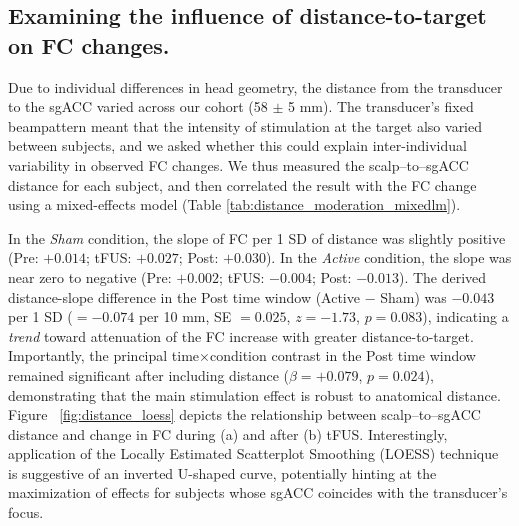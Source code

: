 \subsection*{Examining the influence of distance-to-target on FC changes.}
\noindent
Due to individual differences in head geometry, the distance from the transducer to the sgACC varied across our cohort (58 $\pm$ 5 mm). The transducer's fixed beampattern meant that the intensity of stimulation at the target also varied between subjects, and we asked whether this could explain inter-individual variability in observed FC changes. We thus measured the scalp--to--sgACC distance for each subject, and then correlated the result with the FC change using a mixed-effects model (Table \ref{tab:distance_moderation_mixedlm}).

In the \emph{Sham} condition, the slope of FC per 1 SD of distance was slightly positive (Pre: $+0.014$; tFUS: $+0.027$; Post: $+0.030$). In the \emph{Active} condition, the slope was near zero to negative (Pre: $+0.002$; tFUS: $-0.004$; Post: $-0.013$). The derived distance-slope difference in the Post time window (Active $-$ Sham) was $-0.043$ per 1 SD ($= -0.074$ per 10 mm, SE $=0.025$, $z=-1.73$, $p=0.083$), indicating a \emph{trend} toward attenuation of the FC increase with greater distance-to-target. Importantly, the principal time$\times$condition contrast in the Post time window remained significant after including distance ($\beta=+0.079$, $p=0.024$), demonstrating that the main stimulation effect is robust to anatomical distance. Figure ~\ref{fig:distance_loess} depicts the relationship between scalp--to--sgACC distance and change in FC during (a) and after (b) tFUS. Interestingly, application of the Locally Estimated Scatterplot Smoothing (LOESS) technique is suggestive of an inverted U-shaped curve, potentially hinting at the maximization of effects for subjects whose sgACC coincides with the transducer's focus. 


